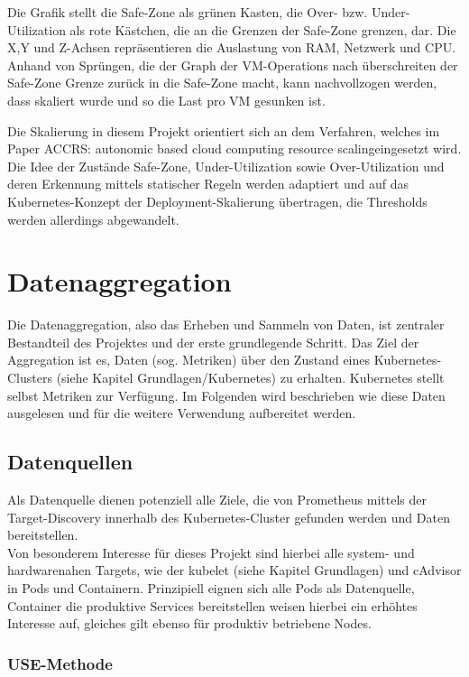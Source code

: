 \documentclass[a4paper,10pt]{scrartcl}
\begin{document}
Die Grafik stellt die Safe-Zone als grünen Kasten, die Over- bzw. Under-Utilization als rote Kästchen, die an die Grenzen der Safe-Zone grenzen, dar. Die X,Y und Z-Achsen repräsentieren die Auslastung von RAM, Netzwerk und CPU. Anhand von Sprüngen, die der Graph der VM-Operations nach überschreiten der Safe-Zone Grenze zurück in die Safe-Zone macht, kann nachvollzogen werden, dass skaliert wurde und so die Last pro VM gesunken ist.

Die Skalierung in diesem Projekt orientiert sich an dem Verfahren, welches im Paper \glqq ACCRS: autonomic based cloud computing resource scaling\grqq eingesetzt wird. Die Idee der Zustände Safe-Zone, Under-Utilization sowie Over-Utilization und deren Erkennung mittels statischer Regeln werden adaptiert und auf das Kubernetes-Konzept der Deployment-Skalierung übertragen, die Thresholds werden allerdings abgewandelt. 


\pagebreak
\section{Datenaggregation}

Die Datenaggregation, also das Erheben und Sammeln von Daten, ist zentraler Bestandteil des Projektes und der erste grundlegende Schritt. Das Ziel der Aggregation ist es, Daten (sog. Metriken) über den Zustand eines Kubernetes-Clusters (siehe Kapitel Grundlagen/Kubernetes) zu erhalten. Kubernetes stellt selbst Metriken zur Verfügung. Im Folgenden wird beschrieben wie diese Daten ausgelesen und für die weitere Verwendung aufbereitet werden.

\subsection{Datenquellen}

Als Datenquelle dienen potenziell alle Ziele, die von Prometheus mittels der Target-Discovery innerhalb des Kubernetes-Cluster gefunden werden und Daten bereitstellen.\\
Von besonderem Interesse für dieses Projekt sind hierbei alle system- und hardwarenahen Targets, wie der kubelet (siehe Kapitel Grundlagen) und cAdvisor in Pods und Containern.
Prinzipiell eignen sich alle Pods als Datenquelle, Container die produktive Services bereitstellen weisen hierbei ein erhöhtes Interesse auf, gleiches gilt ebenso für produktiv betriebene Nodes.

\subsubsection{\glqq USE\grqq-Methode}
\end{document}
